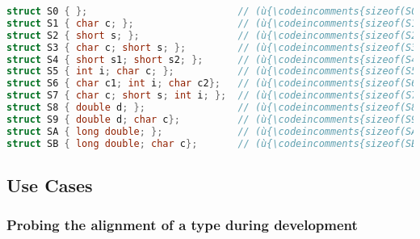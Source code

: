 \begin{lstlisting}[language=C++]
struct S0 { };                          // (ù{\codeincomments{sizeof(S0)}}ù) is  (ù{\codeincomments{1}}ù); (ù{\codeincomments{alignof(S0)}}ù) is  (ù{\codeincomments{1}}ù)
struct S1 { char c; };                  // (ù{\codeincomments{sizeof(S1)}}ù) is  (ù{\codeincomments{1}}ù); (ù{\codeincomments{alignof(S1)}}ù) is  (ù{\codeincomments{1}}ù)
struct S2 { short s; };                 // (ù{\codeincomments{sizeof(S2)}}ù) is  (ù{\codeincomments{2}}ù); (ù{\codeincomments{alignof(S2)}}ù) is  (ù{\codeincomments{2}}ù)
struct S3 { char c; short s; };         // (ù{\codeincomments{sizeof(S3)}}ù) is  (ù{\codeincomments{4}}ù); (ù{\codeincomments{alignof(S3)}}ù) is  (ù{\codeincomments{2}}ù)
struct S4 { short s1; short s2; };      // (ù{\codeincomments{sizeof(S4)}}ù) is  (ù{\codeincomments{4}}ù); (ù{\codeincomments{alignof(S4)}}ù) is  (ù{\codeincomments{2}}ù)
struct S5 { int i; char c; };           // (ù{\codeincomments{sizeof(S5)}}ù) is  (ù{\codeincomments{8}}ù); (ù{\codeincomments{alignof(S5)}}ù) is  (ù{\codeincomments{4}}ù)
struct S6 { char c1; int i; char c2};   // (ù{\codeincomments{sizeof(S6)}}ù) is (ù{\codeincomments{12}}ù); (ù{\codeincomments{alignof(S6)}}ù) is  (ù{\codeincomments{4}}ù)
struct S7 { char c; short s; int i; };  // (ù{\codeincomments{sizeof(S7)}}ù) is  (ù{\codeincomments{8}}ù); (ù{\codeincomments{alignof(S7)}}ù) is  (ù{\codeincomments{4}}ù)
struct S8 { double d; };                // (ù{\codeincomments{sizeof(S8)}}ù) is  (ù{\codeincomments{8}}ù); (ù{\codeincomments{alignof(S8)}}ù) is  (ù{\codeincomments{8}}ù)
struct S9 { double d; char c};          // (ù{\codeincomments{sizeof(S9)}}ù) is (ù{\codeincomments{16}}ù); (ù{\codeincomments{alignof(S9)}}ù) is  (ù{\codeincomments{8}}ù)
struct SA { long double; };             // (ù{\codeincomments{sizeof(SA)}}ù) is (ù{\codeincomments{16}}ù); (ù{\codeincomments{alignof(SA)}}ù) is (ù{\codeincomments{16}}ù)
struct SB { long double; char c};       // (ù{\codeincomments{sizeof(SB)}}ù) is (ù{\codeincomments{32}}ù); (ù{\codeincomments{alignof(SB)}}ù) is (ù{\codeincomments{16}}ù)
\end{lstlisting}


\subsection[Use Cases]{Use Cases}\label{use-cases}

\subsubsection[Probing the alignment of a type during development]{Probing the alignment of a type during development}\label{probing-the-alignment-of-a-type-during-development}

